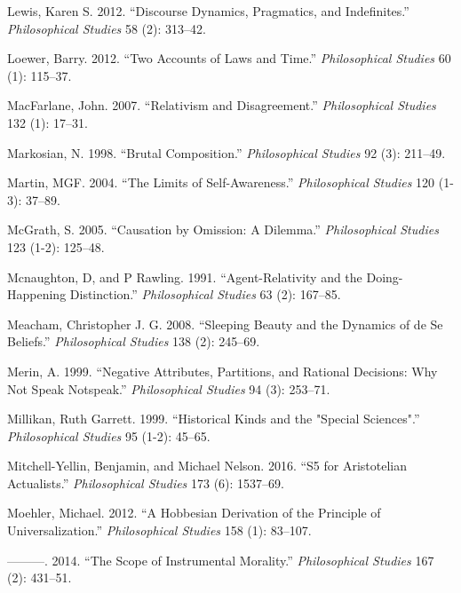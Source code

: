 \documentclass[
  10pt,
  letterpaper,
  DIV=11,
  numbers=noendperiod,
  twoside]{scrartcl}
\newlength{\cslhangindent}
\newenvironment{CSLReferences}[2] %
 {\begin{list}{}{%
  \setlength{\itemindent}{0pt}
  \setlength{\leftmargin}{0pt}
  \setlength{\parsep}{0pt}
  \ifodd #1
   \setlength{\leftmargin}{\cslhangindent}
   \setlength{\itemindent}{-1\cslhangindent}
  \fi
  \setlength{\itemsep}{#2\baselineskip}}}
 {\end{list}}
\begin{document}
\begin{CSLReferences}{1}{0}
Lewis, Karen S. 2012. {``Discourse Dynamics, Pragmatics, and
Indefinites.''} \emph{Philosophical Studies} 58 (2): 313--42.

Loewer, Barry. 2012. {``Two Accounts of Laws and Time.''}
\emph{Philosophical Studies} 60 (1): 115--37.

MacFarlane, John. 2007. {``Relativism and Disagreement.''}
\emph{Philosophical Studies} 132 (1): 17--31.

Markosian, N. 1998. {``Brutal Composition.''} \emph{Philosophical
Studies} 92 (3): 211--49.

Martin, MGF. 2004. {``The Limits of Self-Awareness.''}
\emph{Philosophical Studies} 120 (1-3): 37--89.

McGrath, S. 2005. {``Causation by Omission: A Dilemma.''}
\emph{Philosophical Studies} 123 (1-2): 125--48.

Mcnaughton, D, and P Rawling. 1991. {``Agent-Relativity and the
Doing-Happening Distinction.''} \emph{Philosophical Studies} 63 (2):
167--85.

Meacham, Christopher J. G. 2008. {``Sleeping Beauty and the Dynamics of
de Se Beliefs.''} \emph{Philosophical Studies} 138 (2): 245--69.

Merin, A. 1999. {``Negative Attributes, Partitions, and Rational
Decisions: Why Not Speak Notspeak.''} \emph{Philosophical Studies} 94
(3): 253--71.

Millikan, Ruth Garrett. 1999. {``Historical Kinds and the "Special
Sciences".''} \emph{Philosophical Studies} 95 (1-2): 45--65.

Mitchell-Yellin, Benjamin, and Michael Nelson. 2016. {``S5 for
Aristotelian Actualists.''} \emph{Philosophical Studies} 173 (6):
1537--69.

Moehler, Michael. 2012. {``A Hobbesian Derivation of the Principle of
Universalization.''} \emph{Philosophical Studies} 158 (1): 83--107.

---------. 2014. {``The Scope of Instrumental Morality.''}
\emph{Philosophical Studies} 167 (2): 431--51.


\end{CSLReferences}
\end{document}

